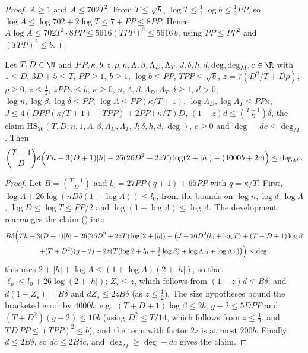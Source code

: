 \begin{proof}
$A\ge1$ and $A\le702T^2$. From $T\le\sqrt b$, $\log T\le\frac12\log b\le\frac12PP$, so
$\log A\le\log702+2\log T\le7+PP\le8PP$. Hence $A\log A\le702T^2\cdot8PP\le5616(TPP)^2\le5616\,b$, using
$PP\le PP^2$ and $(TPP)^2\le b$.
\end{proof}

\begin{lemma}\label{pf:lift1:degnum}
Let $T,D\in\N$ and $PP,\kappa,b,z,\rho,n,\Lambda,\beta,\Lambda_D,\Lambda_T,J,\delta,h,d,\deg,\deg_M,c\in\R$ with
$1\le D$, $3D+5\le T$, $PP\ge1$, $b\ge1$, $\log b\le PP$, $TPP\le\sqrt b$, $z=7(D^2/T+D\rho)$, $\rho\ge0$,
$z\le\frac12$, $zPP\kappa\le b$, $\kappa\ge0$, $n,\Lambda,\beta,\Lambda_D,\Lambda_T,\delta\ge1$, $d>0$,
$\log n,\log\beta,\log\delta\le PP$, $\log\Lambda\le PP(\kappa/T+1)$, $\log\Lambda_D,\log\Lambda_T\le PP\kappa$,
$J\le4(DPP(\kappa/T+1)+TPP)+2PP(\kappa/T)D$, $(1-z)d\le\binom{T-1}D\delta$, the claim
$\mathrm{HS}_{26}(T,D;n,1,\Lambda,\beta,\Lambda_D,\Lambda_T,J;\delta,h,d,\deg)$, $c\ge0$ and
$\deg-dc\le\deg_M$. Then
\[
\binom{T-1}D\delta\Bigl(Th-3(D+1)|h|-26(26D^2+2zT)\log(2+|h|)-(4000b+2c)\Bigr)\le\deg_M .
\]
\end{lemma}

\begin{proof}
Let $B=\binom{T-1}D$ and $l_0=27PP(q+1)+65PP$ with $q=\kappa/T$. First,
$\log\Lambda+26\log(nD\delta(1+\log\Lambda))\le l_0$, from the bounds on $\log n,\log\delta,\log\Lambda$,
$\log D\le\log T\le PP/2$ and $\log(1+\log\Lambda)\le\log\Lambda$. The development rearranges the claim
() into
\begin{multline*}
B\delta\Bigl(Th-3(D+1)|h|-26(26D^2+2zT)\log(2+|h|)-\bigl(J+26D^2(l_0+\log T)+(T+D+1)\log\beta\\
+(T+D^2)(g+2)+2z(T(\log2+l_0+\tfrac12\log\beta)+\log\Lambda_D+\log\Lambda_T)\bigr)\Bigr)\le\deg ;
\end{multline*}
this uses $2+|h|+\log\Lambda\le(1+\log\Lambda)(2+|h|)$, so that $\ell_\rho\le l_0+26\log(2+|h|)$;
$Z_s\le z$, which follows from $(1-z)d\le B\delta$; and $d(1-Z_s)=B\delta$ and $dZ_s\le2zB\delta$ (as
$z\le\frac12$). The size hypotheses bound the bracketed error by $4000b$: e.g.\ $(T+D+1)\log\beta\le2b$,
$g+2\le5DPP$ and $(T+D^2)(g+2)\le10b$ (using $D^2\le T/14$, which follows from $z\le\frac12$, and
$T\,D\,PP\le(TPP)^2\le b$), and the term with factor $2z$ is at most $200b$. Finally $d\le2B\delta$, so
$dc\le2B\delta c$, and $\deg_M\ge\deg-dc$ gives the claim.
\end{proof}

